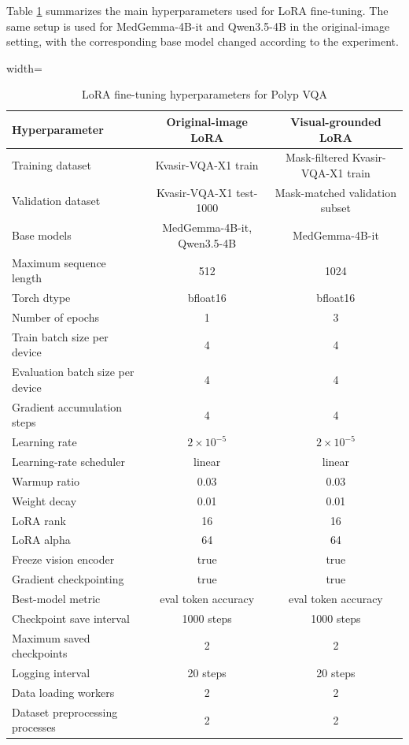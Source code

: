 Table \ref{table:polyp-vqa-training-hyperparameters} summarizes the main hyperparameters used for LoRA fine-tuning. The same setup is used for MedGemma-4B-it and Qwen3.5-4B in the original-image setting, with the corresponding base model changed according to the experiment.

\begin{table}[H]
\centering
\begin{adjustbox}{width=\textwidth}
\begin{tabular}{p{} c c}
\hline\hline
Hyperparameter & Original-image LoRA & Visual-grounded LoRA \\
\hline
Training dataset & Kvasir-VQA-X1 train & Mask-filtered Kvasir-VQA-X1 train \\
Validation dataset & Kvasir-VQA-X1 test-1000 & Mask-matched validation subset \\
Base models & MedGemma-4B-it, Qwen3.5-4B & MedGemma-4B-it \\
Maximum sequence length & 512 & 1024 \\
Torch dtype & bfloat16 & bfloat16 \\
Number of epochs & 1 & 3 \\
Train batch size per device & 4 & 4 \\
Evaluation batch size per device & 4 & 4 \\
Gradient accumulation steps & 4 & 4 \\
Learning rate & $2 \times 10^{-5}$ & $2 \times 10^{-5}$ \\
Learning-rate scheduler & linear & linear \\
Warmup ratio & 0.03 & 0.03 \\
Weight decay & 0.01 & 0.01 \\
LoRA rank & 16 & 16 \\
LoRA alpha & 64 & 64 \\
Freeze vision encoder & true & true \\
Gradient checkpointing & true & true \\
Best-model metric & eval token accuracy & eval token accuracy \\
Checkpoint save interval & 1000 steps & 1000 steps \\
Maximum saved checkpoints & 2 & 2 \\
Logging interval & 20 steps & 20 steps \\
Data loading workers & 2 & 2 \\
Dataset preprocessing processes & 2 & 2 \\
\hline\hline
\end{tabular}
\end{adjustbox}
\caption{LoRA fine-tuning hyperparameters for Polyp VQA}
\label{table:polyp-vqa-training-hyperparameters}
\end{table}

